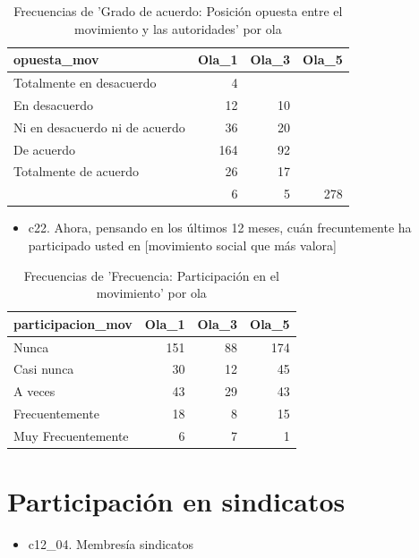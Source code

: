 \documentclass[
  12pt,
]{book}
\providecommand{\tightlist}{%
  \setlength{\itemsep}{0pt}\setlength{\parskip}{0pt}}
\begin{document}
\begin{table}

\caption{\label{tab:unnamed-chunk-20}Frecuencias de 'Grado de acuerdo: Posición opuesta entre el movimiento y las autoridades' por ola}
\centering
\begin{tabular}[t]{l|r|r|r}
\hline
opuesta\_mov & Ola\_1 & Ola\_3 & Ola\_5\\
\hline
Totalmente en desacuerdo & 4 &  & \\
\hline
En desacuerdo & 12 & 10 & \\
\hline
Ni en desacuerdo ni de acuerdo & 36 & 20 & \\
\hline
De acuerdo & 164 & 92 & \\
\hline
Totalmente de acuerdo & 26 & 17 & \\
\hline
 & 6 & 5 & 278\\
\hline
\end{tabular}
\end{table}

\begin{itemize}
\tightlist
\item
  c22. Ahora, pensando en los últimos 12 meses, cuán frecuntemente ha participado usted en {[}movimiento social que más valora{]}
\end{itemize}

\begin{table}

\caption{\label{tab:unnamed-chunk-21}Frecuencias de 'Frecuencia: Participación en el movimiento' por ola}
\centering
\begin{tabular}[t]{l|r|r|r}
\hline
participacion\_mov & Ola\_1 & Ola\_3 & Ola\_5\\
\hline
Nunca & 151 & 88 & 174\\
\hline
Casi nunca & 30 & 12 & 45\\
\hline
A veces & 43 & 29 & 43\\
\hline
Frecuentemente & 18 & 8 & 15\\
\hline
Muy Frecuentemente & 6 & 7 & 1\\
\hline
\end{tabular}
\end{table}

\hypertarget{participaciuxf3n-en-sindicatos}{%
\section{Participación en sindicatos}\label{participaciuxf3n-en-sindicatos}}

\begin{itemize}
\tightlist
\item
  c12\_04. Membresía sindicatos
\end{itemize}
\end{document}
